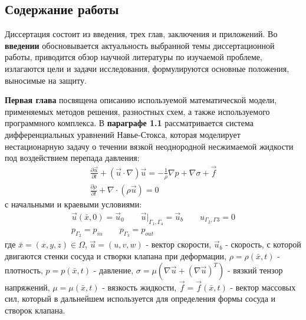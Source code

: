 
\subsection*{\Large Содержание работы}
Диссертация состоит из введения, трех глав, заключения и приложений. Во \textbf{введении} обосновывается актуальность выбранной темы диссертационной работы, приводится обзор научной литературы по изучаемой проблеме, излагаются цели и задачи исследования, формулируются основные положения, выносимые на защиту.

\textbf{Первая глава} посвящена описанию используемой математической модели, применяемых методов решения, разностных схем, а также используемого программного комплекса.
В \textbf{параграфе 1.1} рассматривается система дифференциальных уравнений Навье-Стокса, которая моделирует нестационарную задачу о течении вязкой неоднородной несжимаемой жидкости под воздействием перепада давления:
\begin{gather}
    \label{eq:navier_stokes:motion}
    \frac{\partial \vec{u}}{\partial t} + (\vec{u} \cdot \nabla) \vec{u} = - \frac{1}{\rho} \nabla p + \nabla \sigma + \vec{f}\\
    \label{eq:navier_stokes:continuity}
    \frac{\partial \rho}{\partial t} + \nabla \cdot (\rho \vec{u}) = 0 
\end{gather}
с начальными и краевыми условиями:
\begin{gather}
    \label{eq:navier_stokes:velocity_conditions}
    \vec{u}(\bar{x}, 0) = \vec{u}_0 \qquad \vec{u}|_{\Gamma_1, \Gamma_4} = \vec{u}_b \qquad u_{\Gamma_2, \Gamma3} = 0\\
    \label{eq:navier_stokes:pressure_conditions}
    p_{\Gamma_2} = p_{in} \qquad p_{\Gamma_3} = p_{out}
\end{gather}
где $\bar{x}=(x,y,z) \in \Omega$, $\vec{u}=(u,v,w)$ - вектор скорости, $\vec{u}_b$ - скорость, с которой двигаются стенки сосуда и створки клапана при деформации,
$\rho=\rho(\bar{x}, t)$ - плотность, $p=p(\bar{x}, t)$ - давление, $\sigma = \mu (\nabla \vec{u} + (\nabla \vec{u})^T)$ - вязкий тензор напряжений,
$\mu = \mu(\bar{x}, t)$ - вязкость жидкости, $\vec{f} = \vec{f}(\bar{x}, t)$ - вектор массовых сил, который в дальнейшем используется для определения формы сосуда и створок клапана. 

